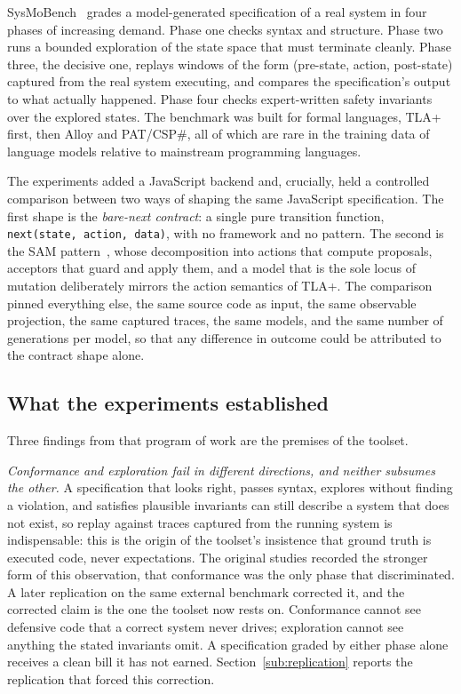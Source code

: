 \documentclass[11pt]{article}
\newcommand{\code}[1]{\texttt{#1}}
\begin{document}
SysMoBench~\cite{sysmobench} grades a model-generated specification of a real
system in four phases of increasing demand. Phase one checks syntax and
structure. Phase two runs a bounded exploration of the state space that must
terminate cleanly. Phase three, the decisive one, replays windows of the form
(pre-state, action, post-state) captured from the real system executing, and
compares the specification's output to what actually happened. Phase four
checks expert-written safety invariants over the explored states. The
benchmark was built for formal languages, TLA+ first, then Alloy and
PAT/CSP\#, all of which are rare in the training data of language models
relative to mainstream programming languages.

The experiments added a JavaScript backend and, crucially, held a controlled
comparison between two ways of shaping the same JavaScript specification. The
first shape is the \emph{bare-next contract}: a single pure transition
function, \code{next(state, action, data)}, with no framework and no pattern.
The second is the SAM pattern~\cite{sam}, whose decomposition into actions
that compute proposals, acceptors that guard and apply them, and a model that
is the sole locus of mutation deliberately mirrors the action semantics of
TLA+. The comparison pinned everything else, the same source code as input,
the same observable projection, the same captured traces, the same models, and
the same number of generations per model, so that any difference in outcome
could be attributed to the contract shape alone.

\subsection{What the experiments established}

Three findings from that program of work are the premises of the toolset.

\emph{Conformance and exploration fail in different directions, and neither
subsumes the other.} A specification that looks right, passes syntax, explores
without finding a violation, and satisfies plausible invariants can still
describe a system that does not exist, so replay against traces captured from
the running system is indispensable: this is the origin of the toolset's
insistence that ground truth is executed code, never expectations. The original
studies recorded the stronger form of this observation, that conformance was the
only phase that discriminated. A later replication on the same external benchmark
corrected it, and the corrected claim is the one the toolset now rests on.
Conformance cannot see defensive code that a correct system never drives;
exploration cannot see anything the stated invariants omit. A specification
graded by either phase alone receives a clean bill it has not earned.
Section~\ref{sub:replication} reports the replication that forced this
correction.
\end{document}
